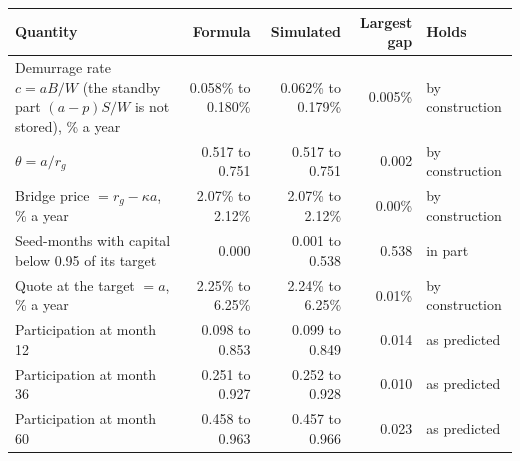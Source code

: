 \begin{tabular}{lrrrl}
\toprule
Quantity & Formula & Simulated & Largest gap & Holds \\
\midrule
Demurrage rate $c = aB/W$ (the standby part $(a - p)S/W$ is not stored), \% a year & 0.058\% to 0.180\% & 0.062\% to 0.179\% & 0.005\% & by construction \\
$\theta = a / r_g$ & 0.517 to 0.751 & 0.517 to 0.751 & 0.002 & by construction \\
Bridge price $= r_g - \kappa a$, \% a year & 2.07\% to 2.12\% & 2.07\% to 2.12\% & 0.00\% & by construction \\
Seed-months with capital below 0.95 of its target & 0.000 & 0.001 to 0.538 & 0.538 & in part \\
Quote at the target $= a$, \% a year & 2.25\% to 6.25\% & 2.24\% to 6.25\% & 0.01\% & by construction \\
Participation at month 12 & 0.098 to 0.853 & 0.099 to 0.849 & 0.014 & as predicted \\
Participation at month 36 & 0.251 to 0.927 & 0.252 to 0.928 & 0.010 & as predicted \\
Participation at month 60 & 0.458 to 0.963 & 0.457 to 0.966 & 0.023 & as predicted \\
\bottomrule
\end{tabular}
